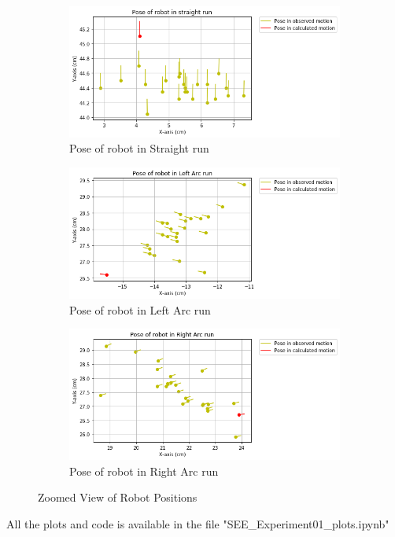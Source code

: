 \documentclass[10pt,a4paper]{article}
\begin{document}
					 \begin{figure}[H]
						 	\begin{subfigure}{0.5\textwidth}
						 		\centering
						 		\includegraphics[width=0.8\linewidth]{img/scatter_plot_st.png}
						 		\caption{Pose of robot in Straight run}
						 	\end{subfigure}
						 	\hfill
						 	\begin{subfigure}{0.5\textwidth}
						 		\centering
						 		\includegraphics[width=0.8\linewidth]{img/scatter_plot_lt.png}
						 		\caption{Pose of robot in Left Arc run}
						 	\end{subfigure}
						 	\begin{subfigure}{0.5\textwidth}
						 		\centering
						 		\includegraphics[width=0.8\linewidth]{img/scatter_plot_rt.png}
						 		\caption{Pose of robot in Right Arc run}
						 	\end{subfigure}
						 	\caption{Zoomed View of Robot Positions}
				     \end{figure}	
				All the plots and code is available in the file "SEE\_Experiment01\_plots.ipynb"\\
\end{document}
